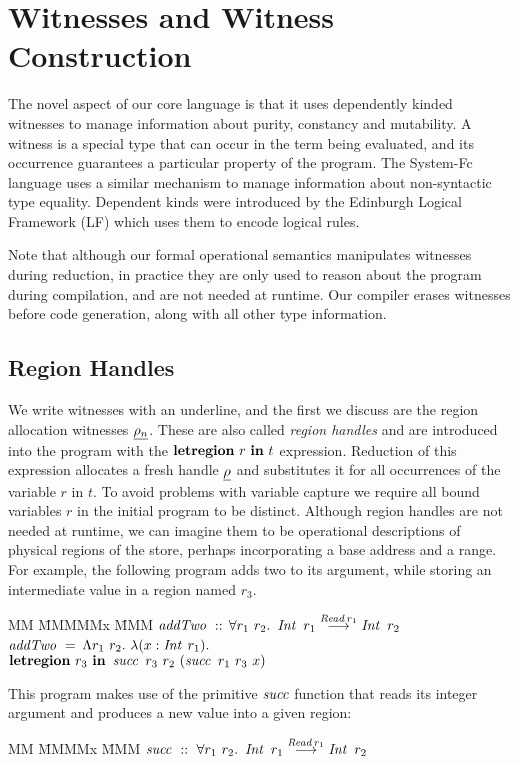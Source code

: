 
\section{Witnesses and Witness Construction}
\label{Witnesses}

The novel aspect of our core language is that it uses dependently kinded witnesses to manage information about purity, constancy and mutability. A witness is a special type that can occur in the term being evaluated, and its occurrence guarantees a particular property of the program. The System-Fc \cite{sulzmann:system-Fc} language uses a similar mechanism to manage information about non-syntactic type equality. Dependent kinds were introduced by the Edinburgh Logical Framework (LF) \cite{avron:edinburgh-lf} which uses them to encode logical rules. 

Note that although our formal operational semantics manipulates witnesses during reduction, in practice they are only used to reason about the program during compilation, and are not needed at runtime. Our compiler erases witnesses before code generation, along with all other type information.


\subsection{Region Handles}
We write witnesses with an underline, and the first we discuss are the region allocation witnesses $\underline{\rho_n}$. These are also called \emph{region handles} and are introduced into the program with the $\textrm{\textbf{letregion}} \ r \ \textrm{\textbf{in}} \ t$ expression. Reduction of this expression allocates a fresh handle $\underline{\rho}$ and substitutes it for all occurrences of the variable $r$ in $t$. To avoid problems with variable capture we require all bound variables $r$ in the initial program to be distinct. Although region handles are not needed at runtime, we can imagine them to be operational descriptions of physical regions of the store, perhaps incorporating a base address and a range. For example, the following program adds two to its argument, while storing an intermediate value in a region named $r_3$.

\begin{tabbing}	
MM \= MMMMMx \= MMM \kill
\>	$\operatorname{\mathit{addTwo}} \ ::$ \> $ \forall r_1 \ r_2. \ \operatorname{\mathit{Int}} \ r_1 \stackrel{\operatorname{\mathit{Read}} r_1}{\longrightarrow} \operatorname{\mathit{Int}} \ r_2$ \\
\>	$\operatorname{\mathit{addTwo}} \ =$ 
		\> $\Lambda r_1 \ r_2. \ \lambda (x : \operatorname{\mathit{Int}} \: r_1).$ \\
\>		\> $\textrm{\textbf{letregion}} \ r_3 \ \textrm{\textbf{in}} \ \operatorname{\mathit{succ}} \ r_3 \ r_2 \ (\operatorname{\mathit{succ}} \ r_1 \ r_3 \ x)$
\end{tabbing}
This program makes use of the primitive $\operatorname{\mathit{succ}}$ function that reads its integer argument and produces a new value into a given region:
\begin{tabbing}	
MM 	\= MMMMx 	\= MMM \kill
	\> $\isucc \ :: \ \forall r_1 \ r_2. \ \iInt \ r_1 \longtoa{\iRead r_1} \iInt \ r_2$	
\end{tabbing}

